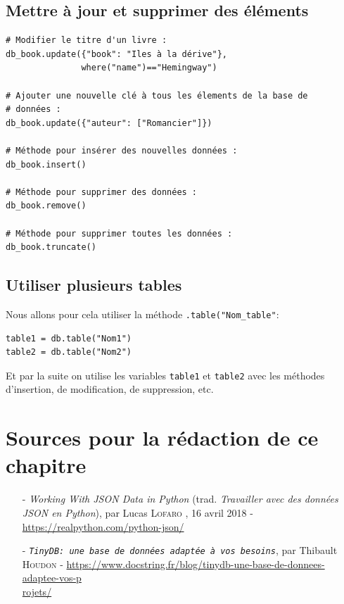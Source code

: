 \documentclass[a4paper,11pt]{book}
\begin{document}
\subsection*{Mettre à jour et supprimer des éléments}
\begin{lstlisting}[caption=Modifier la base de données]
# Modifier le titre d'un livre :
db_book.update({"book": "Iles à la dérive"},
               where("name")=="Hemingway")

# Ajouter une nouvelle clé à tous les élements de la base de 
# données :
db_book.update({"auteur": ["Romancier"]})

# Méthode pour insérer des nouvelles données :
db_book.insert()

# Méthode pour supprimer des données :
db_book.remove()

# Méthode pour supprimer toutes les données :
db_book.truncate()
\end{lstlisting}
\medskip

\subsection*{Utiliser plusieurs tables}
Nous allons pour cela utiliser la méthode \texttt{.table("Nom\_table"}:
\begin{lstlisting}[caption=Créer plusieurs tables]
table1 = db.table("Nom1")
table2 = db.table("Nom2")
\end{lstlisting}
\medskip

Et par la suite on utilise les variables \texttt{table1} et \texttt{table2} avec les méthodes d'insertion, de modification, de suppression, etc.
\medskip

\section*{Sources pour la rédaction de ce chapitre}
\begin{itemize}
	\item[-] \textit{Working With JSON Data in Python} (trad. \textit{Travailler avec des données JSON en Python}), par Lucas \textsc{Lofaro }, 16 avril 2018 - \url{https://realpython.com/python-json/}
	\item[-] \textit{\texttt{TinyDB: une base de données adaptée à vos besoins}}, par Thibault \textsc{Houdon} - \url{https://www.docstring.fr/blog/tinydb-une-base-de-donnees-adaptee-vos-p}\\\url{rojets/}
\end{itemize}
\medskip
\end{document}
